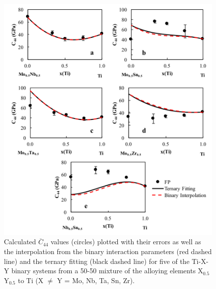 \pagebreak
\begin{figure}[H]
	\centering
	\includegraphics[width=\textwidth]{Chapter-6/Figures/tixyc441.png}
	\caption{Calculated $\overline{C}_{44}$ values (circles) plotted with their errors as well as the interpolation from the binary interaction parameters (red dashed line) and the ternary fitting (black dashed line) for five of the Ti-X-Y binary systems from a 50-50 mixture of the alloying elements X$_{0.5}$Y$_{0.5}$ to Ti (X $\neq$ Y = Mo, Nb, Ta, Sn, Zr).}
	\label{Ch6-figure:tixyc44_1}
\end{figure}

